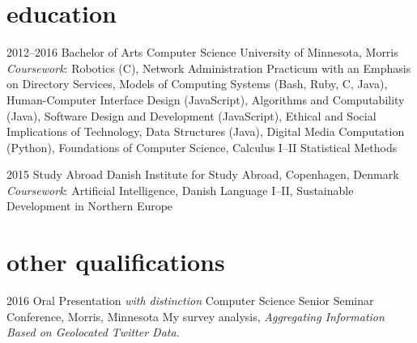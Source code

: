 \documentclass[]{cv-style} %
\begin{document}

\section{education}

\begin{entrylist}


\entry
{2012--2016}
{Bachelor of Arts {\normalfont Computer Science}}
{University of Minnesota, Morris}
{\emph{Coursework}: \footnotesize{Robotics (C), Network Administration Practicum with an Emphasis on Directory Services, Models of Computing Systems (Bash, Ruby, C, Java), Human-Computer Interface Design (JavaScript), Algorithms and Computability (Java), Software Design and Development (JavaScript), Ethical and Social Implications of Technology, Data Structures (Java), Digital Media Computation (Python), Foundations of Computer Science, Calculus I--II Statistical Methods}}

\entry
{2015}
{Study Abroad}
{Danish Institute for Study Abroad, Copenhagen, Denmark}
{\emph{Coursework}: \footnotesize{Artificial Intelligence, Danish Language I--II, Sustainable Development in Northern Europe}}

\end{entrylist}


\section{other qualifications}

\begin{entrylist}


\entry
{2016}
{Oral Presentation {\normalfont \emph{with distinction}}}
{Computer Science Senior Seminar Conference, Morris, Minnesota}
{My survey analysis, \emph{Aggregating Information Based on Geolocated Twitter Data}.}


\end{entrylist}
\end{document}
